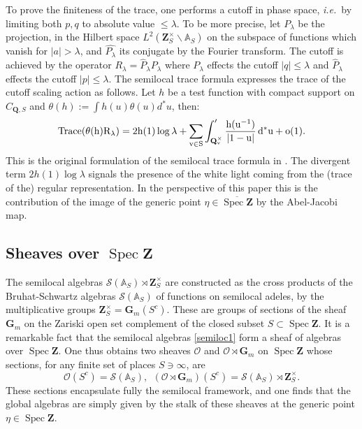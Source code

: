 \documentclass[11pt,a4paper]{article}
\newcommand{\Q}{\mathbf{Q}}
\newcommand{\Z}{\mathbf{Z}}
\newcommand{\A}{\mathbb{A}}
\def\spz{\Spec \Z}
\def\spzb{\overline{\Spec \Z}}
\newcommand{\Spec}{\operatorname{Spec}}
\def\spz{\Spec \Z}
\def\cS{{\mathcal S}}
\def\Tr{\rm{Trace}}
\def\ie{{\it i.e.\/}\ }
\theoremstyle{plain}
\theoremstyle{definition} %
\begin{document}
To prove the finiteness of the trace, one  performs a cutoff in phase space, \ie by limiting both $p,q$ to absolute value $\leq \lambda$.  To be more precise, let $P_\lambda$ be the projection, in the Hilbert space $L^2( \Z_S^\times\backslash \A_{S})$ on the subspace of functions which vanish for  $\vert a\vert >\lambda$, and $\widehat{P_\lambda}$ its conjugate by the Fourier transform.  The cutoff  is achieved by the operator $R_\lambda = \widehat P_\lambda  P_\lambda$ where $ P_\lambda$ effects the cutoff $\vert q\vert \leq \lambda$ and $\widehat P_\lambda$ effects the cutoff $\vert p\vert \leq \lambda$. The semilocal trace formula expresses the trace of the cutoff scaling action as follows. Let $h$ be a test function with compact support on $C_{\Q,S}$ and $\theta(h):=\int h(u)\theta(u)d^*u$, then:
\begin{equation}\label{semilocTrace}
\Tr (\theta(h)R_\lambda) = 2h (1) \log \lambda + \sum_{v \in S}
\int'_{\Q^\times_v} \frac{h(u^{-1}) }{ \vert 1-u \vert} \, d^* u + o(1).
\end{equation}
This is the original formulation of the semilocal trace formula in \cite{Co-zeta}.  The divergent term $2h (1) \log \lambda$ signals the presence of the white light coming from the (trace of the) regular representation. In the perspective of this paper this is the contribution of the image of the generic point $\eta\in \spzb$ by the Abel-Jacobi map. 

\subsection{Sheaves over $\spz$}\label{sectshespec}
The semilocal algebras $\mathcal{S}\left(\mathbb{A}_S\right) \rtimes \mathbf{Z}_S^{\times}$ are constructed as the cross products of the Bruhat-Schwartz algebras $\mathcal{S}(\mathbb{A}_S)$ of functions on semilocal adeles, by the multiplicative groups $\mathbf{Z}_S^{\times}=\mathbf{G}_m(S^c)$. These are groups of sections of the sheaf $\mathbf{G}_m$ on the Zariski open set complement of the closed subset $S\subset \Spec \mathbf{Z}$.
It is a remarkable fact that the semilocal algebras \eqref{semiloc1} form a sheaf of algebras over $\spz$.  One thus obtains two sheaves ${\mathscr{O} }$ and  ${\mathscr{O} }\rtimes \mathbf{G}_m$ on $\spz$ whose sections, for any finite set of places $S\ni \infty$, are
\begin{equation}\label{semiloc2} 
{\mathscr{O} }(S^c)=\cS(\A_{S}), \  \  \left({\mathscr{O} }\rtimes \mathbf{G}_m\right)(S^c)= \cS(\A_{S})\rtimes \Z_S^\times.
\end{equation} 
These sections  encapsulate fully the semilocal framework, and one finds that the global algebras are simply given by the stalk of these sheaves at the generic point   $\eta\in \spz$.
\end{document}
